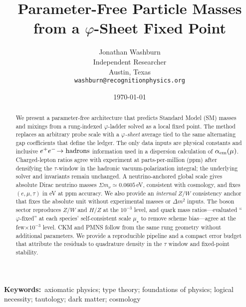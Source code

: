 \documentclass[11pt]{article}
\title{Parameter-Free Particle Masses from a $\varphi$-Sheet Fixed Point}
\author{Jonathan Washburn\\Independent Researcher\\Austin, Texas\\\texttt{washburn@recognitionphysics.org}}
\date{\today}
\newcommand{\keyword}[1]{\textbf{Keywords:}~#1}
\begin{document}
\maketitle

\begin{abstract}
We present a parameter-free architecture that predicts Standard Model (SM) masses and mixings from a rung-indexed $\varphi$-ladder solved as a local fixed point. The method replaces an arbitrary probe scale with a \emph{$\varphi$-sheet} average tied to the same alternating gap coefficients that define the ledger. The only data inputs are physical constants and inclusive $e^+e^-\!\to{\rm hadrons}$ information used in a dispersion calculation of $\alpha_{\rm em}(\mu)$. Charged-lepton ratios agree with experiment at parts-per-million (ppm) after densifying the $\tau$-window in the hadronic vacuum-polarization integral; the underlying solver and invariants remain unchanged. A neutrino-anchored global scale gives absolute Dirac neutrino masses $\Sigma m_\nu\simeq 0.0605$\,eV, consistent with cosmology, and fixes $(e,\mu,\tau)$ in eV at ppm accuracy. We also provide an \emph{internal} $Z/W$ consistency anchor that fixes the absolute unit without experimental masses or $\Delta m^2$ inputs. The boson sector reproduces $Z/W$ and $H/Z$ at the $10^{-3}$ level, and quark mass ratios---evaluated ``$\varphi$-fixed'' at each species' self-consistent scale $\mu_\star$ to remove scheme bias---agree at the few$\times 10^{-3}$ level. CKM and PMNS follow from the same rung geometry without additional parameters. We provide a reproducible pipeline and a compact error budget that attribute the residuals to quadrature density in the $\tau$ window and fixed-point stability.


\end{abstract}

\keyword{axiomatic physics; type theory; foundations of physics; logical necessity; tautology; dark matter; cosmology} 

\end{document}
